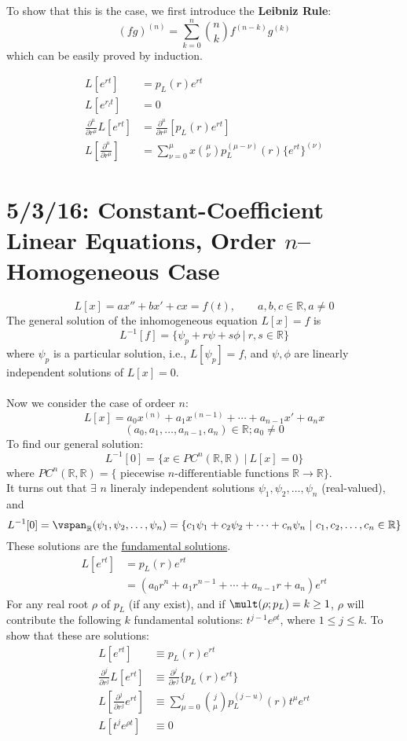 \documentclass[12pt]{article}
\begin{document}
To show that this is the case, we first introduce the \textbf{Leibniz Rule}:
\[ (fg)^{(n)} = \sum_{k=0}^n \binom{n}{k}f^{(n-k)}g^{(k)} \]
which can be easily proved by induction.

\[
\begin{aligned}
  L[e^{rt}] &= p_L(r)e^{rt}  \\
  L[e^{r_lt}] &= 0 \\
  \frac{\partial^{\mu}}{\partial r^{\mu}} L[e^{rt}] &= \frac{\partial^{\mu}}{\partial r^{\mu}} [p_L(r)e^{rt}] \\
  L\left[\frac{\partial^{\mu}}{\partial r^{\mu}}\right] &= \sum_{\nu = 0}^{\mu}x \binom{\mu}{\nu}p_L^{(\mu - \nu)}(r)\{e^{rt}\}^{(\nu)} 
\end{aligned}
\]

\section{5/3/16: Constant-Coefficient Linear Equations, Order $n$--Homogeneous Case}
\[ L[x] = ax'' + bx' + cx = f(t), \qquad a,b,c \in \mathbb{R}, a\neq 0 \]
The general solution of the inhomogeneous equation $L[x] = f$ is \[ L^{-1}[f] = \{\psi_p + r\psi + s\phi \ | \ r,s \in \mathbb{R} \} \] where $\psi_p$ is a particular solution, i.e., $L[\psi_p] = f$, and $\psi, \phi$ are linearly independent solutions of $L[x] = 0$. \\\\
Now we consider the case of ordeer $n$:
\[ L[x] = a_0x^{(n)} + a_1x^{(n-1)} + \cdots + a_{n-1}x' + a_nx \]
\[ (a_0,a_1,\dots,a_{n-1},a_n) \in \mathbb{R}; a_0 \neq 0 \]
To find our general solution:
\[ L^{-1}[0] = \{ x \in PC^n(\mathbb{R},\mathbb{R}) \ | \ L[x] = 0 \} \]
where $PC^n(\mathbb{R},\mathbb{R}) = \{ \text{ piecewise $n$-differentiable functions } \mathbb{R} \to \mathbb{R} \}$. \\
It turns out that $\exists$ $n$ lineraly independent solutions $\psi_1, \psi_2, \dots, \psi_n$ (real-valued), and \[ L^{-1}[0] = \vspan_{\mathbb{R}}(\psi_1,\psi_2,\dots,\psi_n) = \{ c_1\psi_1 + c_2\psi_2 + \cdots + c_n\psi_n \ | \ c_1,c_2,\dots,c_n \in \mathbb{R} \} \]
These solutions are the \underline{fundamental solutions}.
\[
\begin{aligned}
  L[e^{rt}] &= p_L(r)e^{rt} \\
  &= (a_0r^n + a_1r^{n-1} + \cdots + a_{n-1}r + a_n)e^{rt} 
\end{aligned}
\]
For any real root $\rho$ of $p_L$ (if any exist), and if $\mult(\rho; p_L) = k \ge 1$, $\rho$ will contribute the following $k$ fundamental solutions: $t^{j-1}e^{\rho t}$, where $1 \le j \le k$.
To show that these are solutions:
\[
\begin{aligned}
  L[e^{rt}] &\equiv p_L(r)e^{rt} \\
  \frac{\partial^j}{\partial r^j} L[e^{rt}] &\equiv \frac{\partial^j}{\partial r^j}\{p_L(r)e^{rt}\} \\
  L\left[\frac{\partial^j}{\partial r^j}e^{rt}\right] &\equiv \sum_{\mu = 0}^j \binom{j}{\mu} p_L^{(j-u)}(r)t^{\mu}e^{rt} \\
  L[t^je^{\rho t}] &\equiv 0
\end{aligned}
\]
\end{document}
